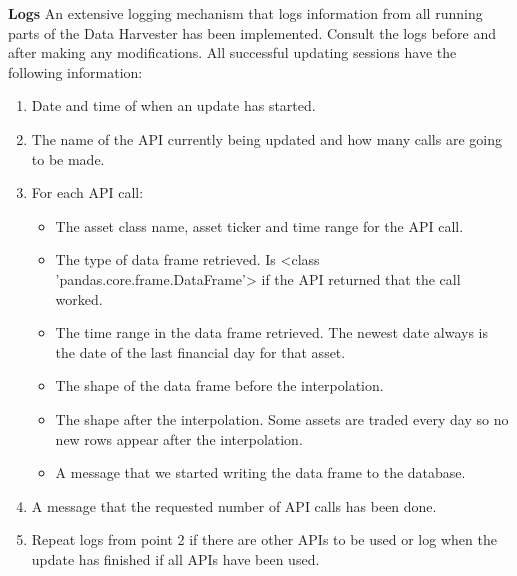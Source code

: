 \documentclass[main.tex]{subfiles}
\begin{document}
\textbf{Logs\newline}
An extensive logging mechanism that logs information from all running parts of the Data Harvester has been implemented. Consult the logs before and after making any modifications. All successful updating sessions have the following information:
\begin{enumerate}
    \item Date and time of when an update has started.
    \item The name of the API currently being updated and how many calls are going to be made.
    \item For each API call: 
        \begin{itemize}
        \item The asset class name, asset ticker and time range for the API call.
        \item The type of data frame retrieved.  Is <class 'pandas.core.frame.DataFrame'> if the API returned that the call worked.
        \item The time range in the data frame retrieved. The newest date always is the date of the last financial day for that asset.
        \item The shape of the data frame before the interpolation.
        \item The shape after the interpolation. Some assets are traded every day so no new rows appear after the interpolation.
        \item A message that we started writing the data frame to the database.
    \end{itemize}
    \item A message that the requested number of API calls has been done.
    \item Repeat logs from point 2 if there are other APIs to be used or log when the update has finished if all APIs have been used.
    
\end{enumerate}
\end{document}
